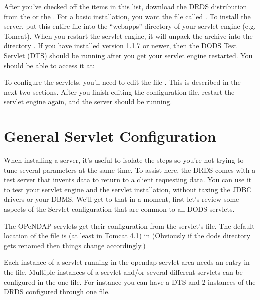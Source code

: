 \documentclass{dods-book}
\begin{document}
After you've checked off the items in this list, download the DRDS
distribution from the \DODShome or the \DODSjava.  For a basic
installation, you want the file called .  To install the
server, put this entire file into the ``webapps'' directory of your
servlet engine (e.g. Tomcat).  When you restart the servlet engine, it
will unpack the archive into the directory . If you have
installed version 1.1.7 or newer, then the DODS Test Servlet (DTS) should
be running after you get your servlet engine restarted. 
You should be able to access it at: 

To configure the servlets, you'll need to edit the file
.   This is described in the next
two sections.  After you finish editing the configuration file,
restart the servlet engine again, and the server should be running.


\section{General Servlet Configuration}

 When installing a server, it's useful
to isolate the steps so you're not trying to tune several parameters
at the same time. To assist here, the DRDS comes with a test server
that invents data to return to a client requesting data. You can use
it to test your servlet engine and the servlet installation, without
taxing the JDBC drivers or your DBMS. We'll get to that in a moment, 
first let's review some aspects of the Servlet configuration that are 
common to all DODS servlets.

The OPeNDAP servlets get their configuration from the servlet's 
 file. The default location of the  file is (at least in Tomcat 4.1) in 
  (Obviously if the dods directory 
 gets renamed then things change accordingly.)

Each instance of a servlet running in the opendap servlet area needs an entry in 
the  file. Multiple instances of a servlet and/or several different servlets 
can be configured in the one  file. For instance you can have a DTS 
and 2 instances of the DRDS configured through one  file.
\end{document}
